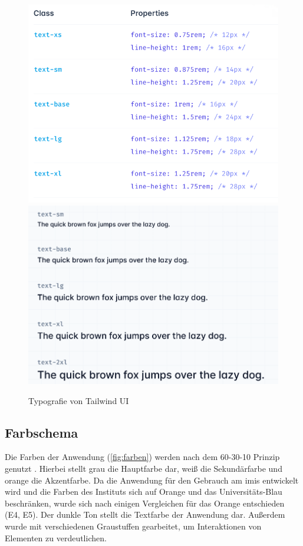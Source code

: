 \begin{figure}[h]
    \centering
    \includegraphics[scale=0.2]{Bilder/Prototyp/Screenshot 2022-09-27 at 15-07-24 Font Size - Tailwind CSS.png}
    \includegraphics[scale=0.2]{Bilder/Prototyp/Screenshot 2022-09-27 at 15-07-37 Font Size - Tailwind CSS.png}
    \caption[Typografie von Tailwind UI]{Typografie von Tailwind UI}
    \label{fig:schrift}
\end{figure}


\subsection{Farbschema}
Die Farben der Anwendung (\ref{fig:farben}) werden nach dem 60-30-10 Prinzip genutzt
\cite{experience_using}. Hierbei stellt grau die Hauptfarbe dar, weiß die Sekundärfarbe und orange
die Akzentfarbe. Da die Anwendung für den Gebrauch am \ac{imis} entwickelt wird und die Farben des
Instituts sich auf Orange und das Universitäts-Blau beschränken, wurde sich nach einigen Vergleichen
für das Orange entschieden (E4, E5). Der dunkle Ton stellt die Textfarbe der Anwendung dar. Außerdem
wurde mit verschiedenen Graustuffen gearbeitet, um Interaktionen von Elementen zu verdeutlichen.

